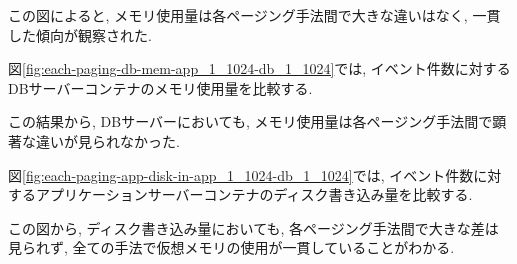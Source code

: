 \documentclass[../../../../main]{subfiles}
\begin{document}
    

    この図によると, メモリ使用量は各ページング手法間で大きな違いはなく, 一貫した傾向が観察された.

    図\ref{fig:each-paging-db-mem-app_1_1024-db_1_1024}では, イベント件数に対するDBサーバーコンテナのメモリ使用量を比較する.

    

    この結果から, DBサーバーにおいても, メモリ使用量は各ページング手法間で顕著な違いが見られなかった.

    \label{subsubsubsec:result-each-paging-only-limit-disk-in}

    図\ref{fig:each-paging-app-disk-in-app_1_1024-db_1_1024}では, イベント件数に対するアプリケーションサーバーコンテナのディスク書き込み量を比較する.

    

    この図から, ディスク書き込み量においても, 各ページング手法間で大きな差は見られず, 全ての手法で仮想メモリの使用が一貫していることがわかる.
\end{document}
